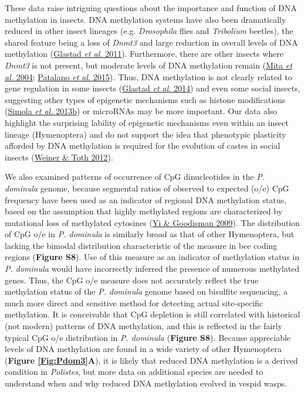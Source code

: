 These data raise intriguing questions about the importance and function
of DNA methylation in insects. DNA methylation systems have also been
dramatically reduced in other insect lineages (e.g. \textit{Drosophila}
flies and \textit{Tribolium} beetles), the shared feature being a loss of
\textit{Dnmt3} and large reduction in overall levels of DNA methylation
(\protect\hyperlink{ux5fENREFux5f13}{Glastad \textit{et al.} 2011}).
Furthermore, there are other insects where \textit{Dnmt3} is not present,
but moderate levels of DNA methylation remain
(\protect\hyperlink{ux5fENREFux5f36}{Mita \textit{et al.} 2004};
\protect\hyperlink{ux5fENREFux5f43}{Patalano \textit{et al.}
2015})\textit{.} Thus, DNA methylation is not clearly related to gene
regulation in some insects (\protect\hyperlink{ux5fENREFux5f12}{Glastad
\textit{et al.} 2014}) and even some social insects, suggesting other
types of epigenetic mechanisms such as histone modifications
(\protect\hyperlink{ux5fENREFux5f53}{Simola \textit{et al.} 2013b}) or
microRNAs may be more important. Our data also highlight the surprising
lability of epigenetic mechanisms even within an insect lineage
(Hymenoptera) and do not support the idea that phenotypic plasticity
afforded by DNA methylation is required for the evolution of castes in
social insects (\protect\hyperlink{ux5fENREFux5f68}{Weiner \& Toth
2012}).

We also examined patterns of occurrence of CpG dinucleotides in the
\textit{P. dominula} genome, because segmental ratios of observed to
expected (o/e) CpG frequency have been used as an indicator of regional
DNA methylation status, based on the assumption that highly methylated
regions are characterized by mutational loss of methylated cytosines
(\protect\hyperlink{ux5fENREFux5f76}{Yi \& Goodisman 2009}). The
distribution of CpG o/e in \textit{P. dominula} is similarly broad as that
of other Hymenoptera, but lacking the bimodal distribution
characteristic of the measure in bee coding regions (\textbf{Figure
S8}). Use of this measure as an indicator of methylation status in
\textit{P. dominula} would have incorrectly inferred the presence of
numerous methylated genes. Thus, the CpG o/e measure does not accurately
reflect the true methylation status of the \textit{P. dominula} genome
based on bisulfite sequencing, a much more direct and sensitive method
for detecting actual site-specific methylation. It is conceivable that
CpG depletion is still correlated with historical (not modern) patterns
of DNA methylation, and this is reflected in the fairly typical CpG o/e
distribution in \textit{P. dominula} (\textbf{Figure S8})\textit{.} Because
appreciable levels of DNA methylation are found in a wide variety of
other Hymenoptera (\textbf{Figure \ref{Fig:Pdom3}A}), it is likely that reduced DNA
methylation is a derived condition in \textit{Polistes}, but more data on
additional species are needed to understand when and why reduced DNA
methylation evolved in vespid wasps.

